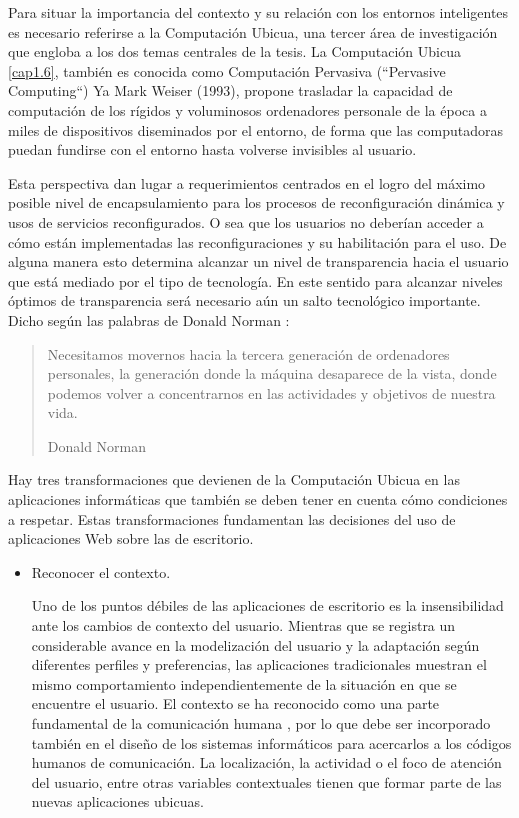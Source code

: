 {Para situar la importancia del contexto y su relación con los entornos
inteligentes es necesario referirse a la Computación Ubicua, una tercer área de
investigación que engloba a los dos temas centrales de la tesis. La Computación
Ubicua \ref{cap1.6}, también es conocida como Computación Pervasiva (``Pervasive
Computing``) Ya Mark Weiser (1993), propone trasladar la capacidad de computación de
los rígidos y voluminosos ordenadores personale de la época a miles de dispositivos
diseminados por el entorno, de forma que las computadoras puedan fundirse con el
entorno hasta volverse invisibles al usuario.

Esta perspectiva dan lugar a requerimientos centrados en el logro del máximo
posible nivel de encapsulamiento para los procesos de reconfiguración
dinámica y usos de servicios reconfigurados. O sea que los usuarios no deberían acceder a cómo están
implementadas las reconfiguraciones y su habilitación para el uso. De alguna
manera esto determina alcanzar un nivel de transparencia hacia el usuario que
está mediado por el tipo de tecnología. En este sentido para alcanzar
niveles óptimos de transparencia será necesario aún un salto tecnológico
importante. Dicho según las palabras de Donald Norman \cite{cap1.196}:

\begin{quote}
Necesitamos movernos hacia la tercera generación de ordenadores
personales, la generación donde la máquina desaparece de la vista,
donde podemos volver a concentrarnos en las actividades y objetivos
de nuestra vida.
\begin{flushright} Donald Norman \end{flushright}
\end{quote} 

Hay tres transformaciones que devienen de la Computación Ubicua en las
aplicaciones informáticas que también se deben tener en cuenta cómo
condiciones a respetar. Estas transformaciones fundamentan las decisiones del uso de
aplicaciones Web sobre las de escritorio.

\begin{itemize}
 
\item Reconocer el contexto. 

Uno de los puntos débiles de las aplicaciones de escritorio es la insensibilidad
ante los cambios de contexto del usuario.
Mientras que se registra un considerable avance en la modelización del usuario
y la adaptación según diferentes perfiles y preferencias, las aplicaciones
tradicionales muestran el mismo comportamiento independientemente de la
situación en que se encuentre el usuario. El contexto se ha reconocido como
una parte fundamental de la comunicación humana \cite{cap1.69}, por lo que
debe ser incorporado también en el diseño de los sistemas informáticos para
acercarlos a los códigos humanos de comunicación. La localización, la actividad o
el foco de atención del usuario, entre otras variables contextuales tienen que
formar parte de las nuevas aplicaciones ubicuas.


\end{itemize}}
